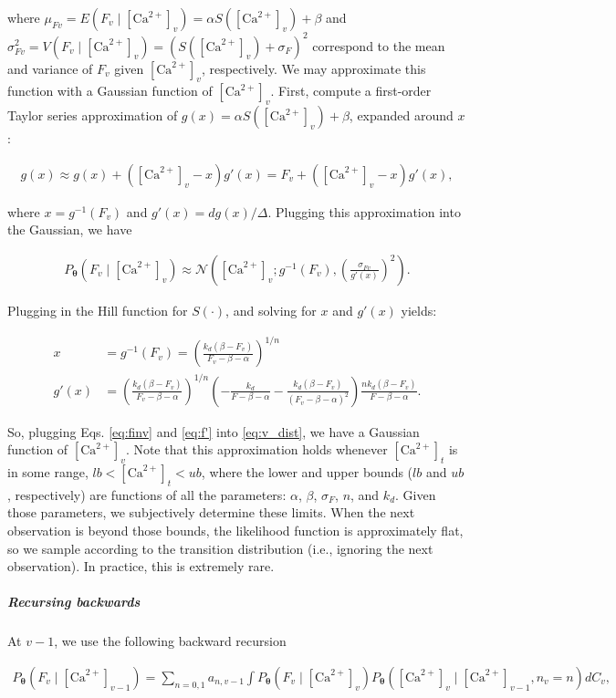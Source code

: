 \documentclass[12pt]{article}
\providecommand{\ve}[1]{\boldsymbol{#1}}
\providecommand{\ve}[1]{\boldsymbol{#1}}
\newcommand{\thetn}{\ve{\theta}}
\newcommand{\p}{P_{\thetn}}
\newcommand{\Ca}{[\text{Ca}^{2+}]}
\begin{document}
\noindent where $\mu_{Fv}=E(F_v \mid \Ca_v) = \alpha S(\Ca_v) + \beta$ and $\sigma_{Fv}^2= V(F_v \mid \Ca_v) = (S(\Ca_v) + \sigma_F)^2$ correspond to the mean and variance of $F_v$ given $\Ca_v$, respectively.  We may approximate this function with a Gaussian function of $\Ca_v$.  First, compute a first-order Taylor series approximation of $g(x)=\alpha S(\Ca_v)+\beta$, expanded around $x$:

\begin{align}
g(x) \approx g(x) + (\Ca_v - x) g'(x) = F_v + (\Ca_v - x) g'(x),
\end{align}

\noindent where $x = g^{-1}(F_v)$ and $g'(x)=dg(x)/\Delta$. Plugging this approximation into the Gaussian, we have

\begin{align} \label{eq:v_dist}
\p(F_v \mid \Ca_v) \approx \mathcal{N}\left(\Ca_v; g^{-1}(F_v), \left(\frac{\sigma_{Fv}}{g'(x)}\right)^2\right).
\end{align}

Plugging in the Hill function for $S(\cdot)$, and solving for $x$ and $g'(x)$ yields:

\begin{align} \label{eq:finv}
x &= g^{-1}(F_v) =  \left(\frac{k_d (\beta - F_v)}{F_v - \beta - \alpha}\right)^{1/n}\\ \label{eq:f'}
g'(x) &= \left(\frac{k_d (\beta -F_v)}{F_v - \beta - \alpha}\right)^{1/n} \left(-\frac{k_d}{F-\beta-\alpha}-\frac{k_d(\beta-F_v)}{(F_v-\beta-\alpha)^2}\right) \frac{n k_d (\beta - F_v)}{F-\beta-\alpha}.
\end{align}

So, plugging Eqs. \ref{eq:finv} and \ref{eq:f'} into \ref{eq:v_dist}, we have a Gaussian function of $\Ca_v$. Note that this approximation holds whenever $\Ca_t$ is in some range, $lb<\Ca_t<ub$, where the lower and upper bounds ($lb$ and $ub$, respectively) are functions of all the parameters: $\alpha$, $\beta$, $\sigma_F$, $n$, and $k_d$. Given those parameters, we subjectively determine these limits. When the next observation is beyond those bounds, the likelihood function is approximately flat, so we sample according to the transition distribution (i.e., ignoring the next observation).  In practice, this is extremely rare.

\subparagraph{Recursing backwards}

At $v-1$, we use the following backward recursion

\begin{align} \label{aeq:mix1}
\p(F_v \mid \Ca_{v-1}) = \sum_{n=0,1} a_{n,v-1} \int \p(F_v \mid \Ca_v) \p(\Ca_v \mid \Ca_{v-1}, n_v=n) dC_v,
\end{align}
\end{document}
